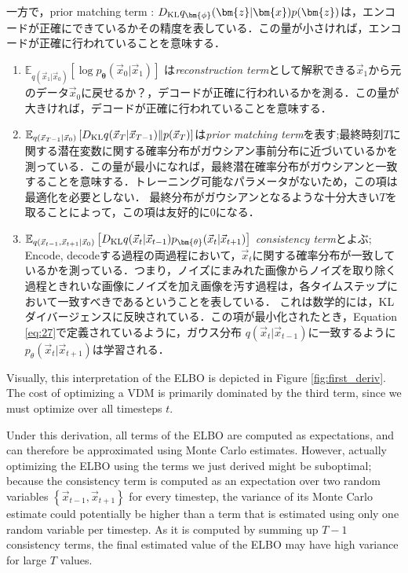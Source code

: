 一方で，prior matching term : $D_{\rm{KL}}{q_{\bm{\phi}}(\bm{z}|\bm{x})}{p(\bm{z})}$は，エンコードが正確にできているかその精度を表している．この量が小さければ，エンコードが正確に行われていることを意味する．
\begin{enumerate}
    \item $\mathbb{E}_{q(\vec{x}_{1}|\vec{x}_0)}\left[\log p_{\bm{\theta}}(\vec{x}_0|\vec{x}_1)\right]$ は\textit{reconstruction term}として解釈できる$\Vec{x}_1$から元のデータ$\Vec{x}_0$に戻せるか？，デコードが正確に行われいるかを測る．この量が大きければ，デコードが正確に行われていることを意味する．
    \item $\mathbb{E}_{q(\vec{x}_{T-1}|\vec{x}_0)}\left[D_{\rm{KL}}{q(\vec{x}_T|\vec{x}_{T-1})}\|{p(\vec{x}_T)}\right]$は\textit{prior matching term}を表す;最終時刻$T$に関する潜在変数に関する確率分布がガウシアン事前分布に近づいているかを測っている．この量が最小になれば，最終潜在確率分布がガウシアンと一致することを意味する．トレーニング可能なパラメータがないため，この項は最適化を必要としない． 最終分布がガウシアンとなるような十分大きい$T$を取ることによって，この項は友好的に0になる．
    \item $\mathbb{E}_{q(\vec{x}_{t-1}, \vec{x}_{t+1}|\vec{x}_0)}\left[D_{\rm{KL}}{q(\vec{x}_{t}|\vec{x}_{t-1})}{p_{\bm{\theta}}(\vec{x}_{t}|\vec{x}_{t+1})}\right]$ \textit{consistency term}とよぶ; Encode, decodeする過程の両過程において，$\vec{x}_t$に関する確率分布が一致しているかを測っている．つまり，ノイズにまみれた画像からノイズを取り除く過程ときれいな画像にノイズを加え画像を汚す過程は，各タイムステップにおいて一致すべきであるということを表している．
    これは数学的には，KLダイバージェンスに反映されている．この項が最小化されたとき，Equation \ref{eq:27}で定義されているように，ガウス分布 $q(\vec{x}_t|\vec{x}_{t-1})$に一致するように$p_{\theta}(\vec{x}_t|\vec{x}_{t+1})$は学習される．
\end{enumerate}





Visually, this interpretation of the ELBO is depicted in Figure \ref{fig:first_deriv}.  The cost of optimizing a VDM is primarily dominated by the third term, since we must optimize over all timesteps $t$.

Under this derivation, all terms of the ELBO are computed as expectations, and can therefore be approximated using Monte Carlo estimates.  However, actually optimizing the ELBO using the terms we just derived might be suboptimal; because the consistency term is computed as an expectation over two random variables $\left\{\vec{x}_{t-1}, \vec{x}_{t+1}\right\}$ for every timestep, the variance of its Monte Carlo estimate could potentially be higher than a term that is estimated using only one random variable per timestep.  As it is computed by summing up $T-1$ consistency terms, the final estimated value of the ELBO may have high variance for large $T$ values.

